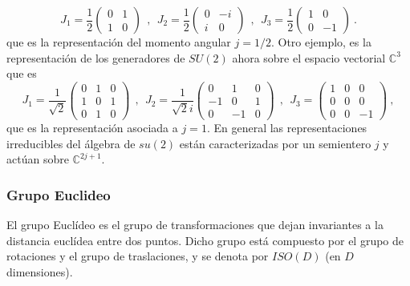 \begin{equation}
    J_{1}=\frac{1}{2}\left( \begin{array}{cc}
    0 & 1 \\ 
    1 & 0
    \end{array}\right) ~\ ,~\ J_{2}=\frac{1}{2}\left( \begin{array}{cc}
    0 & -i \\ 
    i & 0
    \end{array}
    \right) ~\ ,~\ J_{3}=\frac{1}{2}\left( 
    \begin{array}{cc}
    1 & 0 \\ 
    0 & -1
    \end{array} \right) ~.
\end{equation}
que es la representación del momento angular $j=1/2$. Otro ejemplo, es la representación de los generadores de $SU(2)$ ahora sobre el espacio vectorial $\mathbb{C}^{3}$ que es
\begin{equation}
    J_{1}=\frac{1}{\sqrt{2}}\left( \begin{array}{ccc}
    0 & 1 & 0 \\ 
    1 & 0 & 1 \\ 
    0 & 1 & 0 \end{array} \right) ~\ ,~\ J_{2}=\frac{1}{\sqrt{2}i}\left( \begin{array}{ccc}
    0 & 1 & 0 \\ 
    -1 & 0 & 1 \\ 
    0 & -1 & 0
    \end{array}
    \right) ~\ ,~\ J_{3}=\left( \begin{array}{ccc}
    1 & 0 & 0 \\ 
    0 & 0 & 0 \\ 
    0 & 0 & -1
    \end{array}
    \right) ~,
\end{equation}
que es la representación asociada a $j=1$. En general las representaciones irreducibles del álgebra de $su(2)$ están caracterizadas por un semientero $j$ y actúan sobre $\mathbb{C}^{2j+1}$.\\

\subsubsection{Grupo Euclideo}
El grupo Euclídeo es el grupo de transformaciones que dejan invariantes a la distancia euclídea entre dos puntos. Dicho grupo está compuesto por el grupo de rotaciones y el grupo de traslaciones, y se denota por $ISO(D)$  (en $D$ dimensiones).\\

